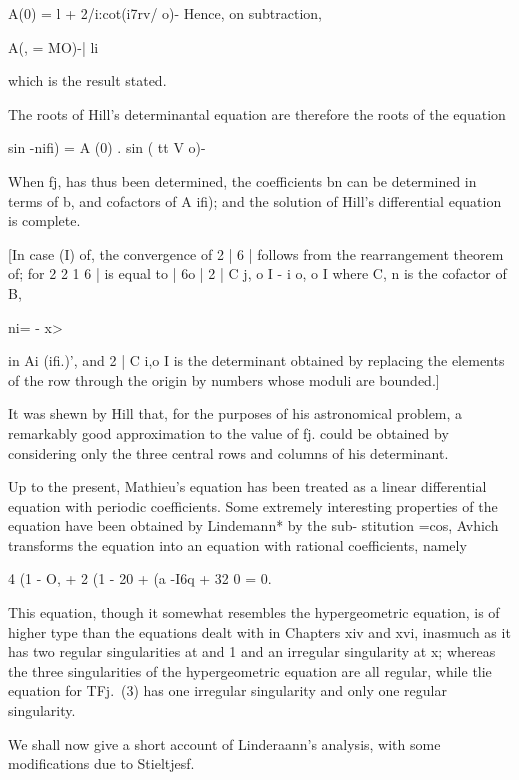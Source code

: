 A(0) = l + 2/i:cot(i7rv/ o)- Hence, on subtraction,

A(, = MO)-| li

which is the result stated.

The roots of Hill's determinantal equation are therefore the roots of
the equation

sin -nifi) = A (0) . sin ( tt V o)-

When fj, has thus been determined, the coefficients bn can be
determined in terms of b, and cofactors of A ifi); and the solution
of Hill's differential equation is complete.

%
%

[In case (I) of, the convergence of 2 | 6 | follows from the
rearrangement theorem of; for 2 2 1 6 | is equal to | 6o | 2 |
C j, o I - i o, o I where C, n is the cofactor of B,

ni= - x>

in Ai (ifi.)', and 2 | C i,o I is the determinant obtained by
replacing the elements of the row through the origin by numbers whose
moduli are bounded.]

It was shewn by Hill that, for the purposes of his astronomical
problem, a remarkably good approximation to the value of fj. could be
obtained by considering only the three central rows and columns of his
determinant.


Up to the present, Mathieu's equation has been treated as a linear
differential equation with periodic coefficients. Some extremely
interesting properties of the equation have been obtained by
Lindemann* by the sub- stitution =cos, Avhich transforms the equation
into an equation with rational coefficients, namely

4 (1 - O, + 2 (1 - 20 + (a -I6q + 32 0 = 0.

This equation, though it somewhat resembles the hypergeometric
equation, is of higher type than the equations dealt with in Chapters
xiv and xvi, inasmuch as it has two regular singularities at and 1 and
an irregular singularity at x; whereas the three singularities of the
hypergeometric equation are all regular, while tlie equation for TFj.\
(3) has one irregular singularity and only one regular singularity.

We shall now give a short account of Linderaann's analysis, with some
modifications due to Stieltjesf.

